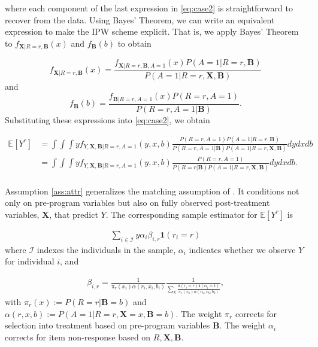 \noindent where each component of the last expression in \eqref{eq:case2} is straightforward to recover from the data. Using Bayes' Theorem, we can write an equivalent expression to make the IPW scheme explicit. That is, we apply Bayes' Theorem to $f_{\bm{X} | R=r, \bm{B} }(x)$ and $f_{\bm{B}} (b)$ to obtain

\begin{equation*}
f_{\bm{X}|R=r,\bm{B}}(x) = \frac{f_{\bm{X}|R=r,\bm{B},A=1}(x) P(A=1|R=r,\bm{B})}{P(A=1|R=r,\bm{X},\bm{B})}
\end{equation*}
and
\begin{equation*}
	f_{\bm{B}} (b) = \frac{f_{\bm{B}|R=r,A=1} (x) P(R=r,A=1)}{P(R=r,A=1|\bm{B})}.
\end{equation*}
\noindent Substituting these expressions into \eqref{eq:case2}, we obtain

\begin{align*} \label{eq:case2ipw}
\mathbb{E}[Y^r] & = \int \int \int y f_{Y,\bm{X},\bm{B}|R=r,A=1}(y,x,b) \frac{P(R=r,A=1) P(A=1|R=r,\bm{B})}{P(R=r,A=1|\bm{B}) P(A=1|R=r,\bm{X},\bm{B})} dydxdb \\
	            & = \int \int  \int y f_{Y,\bm{X},\bm{B}|R=r,A=1}(y,x,b) \frac{P(R=r,A=1)}{P(R=r|\bm{B}) P(A=1|R=r,\bm{X},\bm{B})} dydxdb. \\
\end{align*}

\noindent Assumption \ref{ass:attr} generalizes the matching assumption of \citet{Campbell_Conti_etal_2014_EarlyChildhoodInvestments}. It conditions not only on pre-program variables but also on fully observed post-treatment variables, $\bm{X}$, that predict $Y$. The corresponding sample estimator for $\mathbb{E}[Y^r]$ is

\begin{align*}
\sum_{i \in \mathcal{I}} y \alpha_{i} \beta_{i,r} \mathbf{1}(r_i = r)
\end{align*}
\noindent where $\mathcal{I}$ indexes the individuals in the sample, $\alpha_i$ indicates whether we observe $Y$ for individual $i$, and

\begin{align*}
	\beta_{i,r} = \frac{1}{\pi_r(x_i) \alpha(r_i,x_i,b_i)} \frac{1}{\sum_k{\frac{\mathbf{1}(r_i = r) \mathbf{1}(\alpha_i = 1)}{\pi_r(x_k)\alpha(r_k,x_k,b_k)}}},
\end{align*}
\noindent with $\pi_r(x) := P(R=r|\bm{B}=b)$ and $\alpha(r,x,b) := P(A=1|R=r,\bm{X}=x,\bm{B}=b)$. The weight $\pi_r$ corrects for selection into treatment based on pre-program variables $\bm{B}$. The weight $\alpha_{i}$ corrects for item non-response based on $R, \bm{X}, \bm{B}$.

